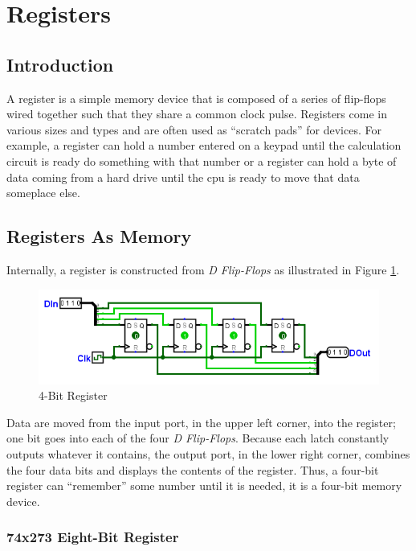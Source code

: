 \section{Registers}
\label{SL:sec:registers}

\subsection{Introduction}
\label{SL:subsec:intro_to_registers}

A register is a simple memory device that is composed of a series of flip-flops wired together such that they share a common clock pulse. Registers come in various sizes and types and are often used as ``scratch pads'' for devices. For example, a register can hold a number entered on a keypad until the calculation circuit is ready do something with that number or a register can hold a byte of data coming from a hard drive until the \gls{cpu} is ready to move that data someplace else. 

\subsection{Registers As Memory}
\label{SL:subsec:registers_as_memory}

Internally, a register is constructed from \emph{D Flip-Flops} as illustrated in Figure \ref{fig:09_08}.

\begin{figure}[H]
	\centering
	\includegraphics[width=\maxwidth{.95\linewidth}]{gfx/09_08}
	\caption{4-Bit Register}
	\label{fig:09_08}
\end{figure}

Data are moved from the input port, in the upper left corner, into the register; one bit goes into each of the four \emph{D Flip-Flops}. Because each latch constantly outputs whatever it contains, the output port, in the lower right corner, combines the four data bits and displays the contents of the register. Thus, a four-bit register can ``remember'' some number until it is needed, it is a four-bit memory device.

\subsubsection{74x273 Eight-Bit Register}
\label{SL:subsubsec:74x273_8-bit_register}

